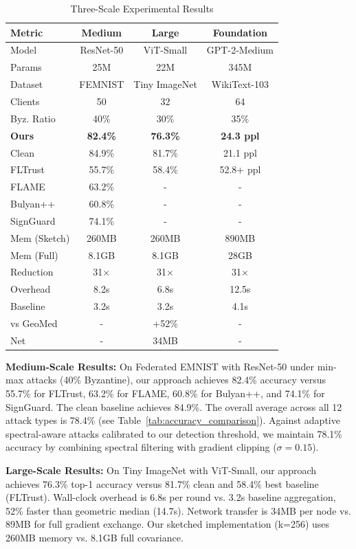 \documentclass[runningheads]{llncs}
\begin{document}
\begin{table}[t]
\centering
\footnotesize
\caption{Three-Scale Experimental Results}
\label{tab:three_scale_results}
\setlength{\tabcolsep}{4pt}
\begin{tabular}{|l|c|c|c|}
\hline
\textbf{Metric} & \textbf{Medium} & \textbf{Large} & \textbf{Foundation} \\
\hline
Model & ResNet-50 & ViT-Small & GPT-2-Medium \\
Params & 25M & 22M & 345M \\
Dataset & FEMNIST & Tiny ImageNet & WikiText-103 \\
Clients & 50 & 32 & 64 \\
Byz. Ratio & 40\% & 30\% & 35\% \\
\hline
\textbf{Ours} & \textbf{82.4\%} & \textbf{76.3\%} & \textbf{24.3 ppl} \\
Clean & 84.9\% & 81.7\% & 21.1 ppl \\
FLTrust & 55.7\% & 58.4\% & 52.8+ ppl \\
FLAME & 63.2\% & - & - \\
Bulyan++ & 60.8\% & - & - \\
SignGuard & 74.1\% & - & - \\
\hline
Mem (Sketch) & 260MB & 260MB & 890MB \\
Mem (Full) & 8.1GB & 8.1GB & 28GB \\
Reduction & 31$\times$ & 31$\times$ & 31$\times$ \\
\hline
Overhead & 8.2s & 6.8s & 12.5s \\
Baseline & 3.2s & 3.2s & 4.1s \\
vs GeoMed & - & +52\% & - \\
Net & - & 34MB & - \\
\hline
\end{tabular}
\end{table}

\textbf{Medium-Scale Results:} On Federated EMNIST with ResNet-50 under min-max attacks (40\% Byzantine), our approach achieves 82.4\% accuracy versus 55.7\% for FLTrust, 63.2\% for FLAME, 60.8\% for Bulyan++, and 74.1\% for SignGuard. The clean baseline achieves 84.9\%. The overall average across all 12 attack types is 78.4\% (see Table~\ref{tab:accuracy_comparison}). Against adaptive spectral-aware attacks calibrated to our detection threshold, we maintain 78.1\% accuracy by combining spectral filtering with gradient clipping ($\sigma=0.15$).

\textbf{Large-Scale Results:} On Tiny ImageNet with ViT-Small, our approach achieves 76.3\% top-1 accuracy versus 81.7\% clean and 58.4\% best baseline (FLTrust). Wall-clock overhead is 6.8s per round vs. 3.2s baseline aggregation, 52\% faster than geometric median (14.7s). Network transfer is 34MB per node vs. 89MB for full gradient exchange. Our sketched implementation (k=256) uses 260MB memory vs. 8.1GB full covariance.
\end{document}
